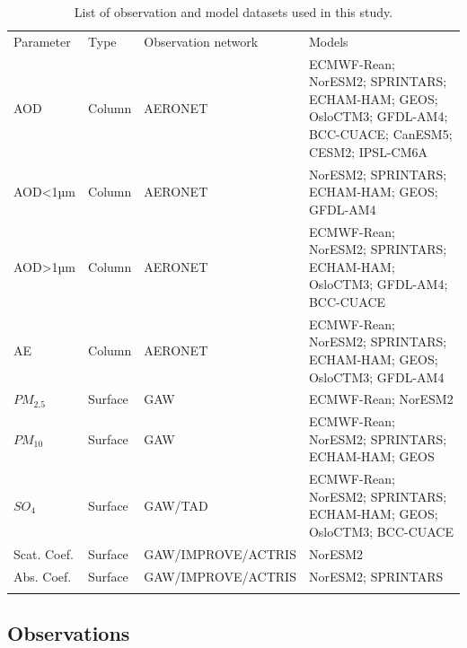\documentclass[journal abbreviation, manuscript]{copernicus}
\begin{document}
\begin{table}
 \begin{tabularx}{\textwidth}{lllX}
  \tophline
  Parameter   & Type    & Observation network & Models                                                                                                    \\
  \middlehline
  AOD         & Column  & AERONET             & ECMWF-Rean; NorESM2; SPRINTARS; ECHAM-HAM; GEOS; OsloCTM3; GFDL-AM4; BCC-CUACE; CanESM5; CESM2; IPSL-CM6A \\
  AOD<1µm     & Column  & AERONET             & NorESM2; SPRINTARS; ECHAM-HAM; GEOS; GFDL-AM4                                                             \\
  AOD>1µm     & Column  & AERONET             & ECMWF-Rean; NorESM2; SPRINTARS; ECHAM-HAM; OsloCTM3; GFDL-AM4; BCC-CUACE                                  \\
  AE          & Column  & AERONET             & ECMWF-Rean; NorESM2; SPRINTARS; ECHAM-HAM; GEOS; OsloCTM3; GFDL-AM4                                       \\
  $PM_{2.5}$  & Surface & GAW                 & ECMWF-Rean; NorESM2                                                                                       \\
  $PM_{10}$   & Surface & GAW                 & ECMWF-Rean; NorESM2; SPRINTARS; ECHAM-HAM; GEOS                                                           \\
  $SO_{4}$    & Surface & GAW/TAD             & ECMWF-Rean; NorESM2; SPRINTARS; ECHAM-HAM; GEOS; OsloCTM3; BCC-CUACE                                      \\
  Scat. Coef. & Surface & GAW/IMPROVE/ACTRIS  & NorESM2                                                                                                   \\
  Abs. Coef.  & Surface & GAW/IMPROVE/ACTRIS  & NorESM2; SPRINTARS                                                                                        \\
  \bottomhline
 \end{tabularx}
 \caption{List of observation and model datasets used in this study.}
 \label{table:datasets}
\end{table}

\subsection{Observations}
\end{document}
